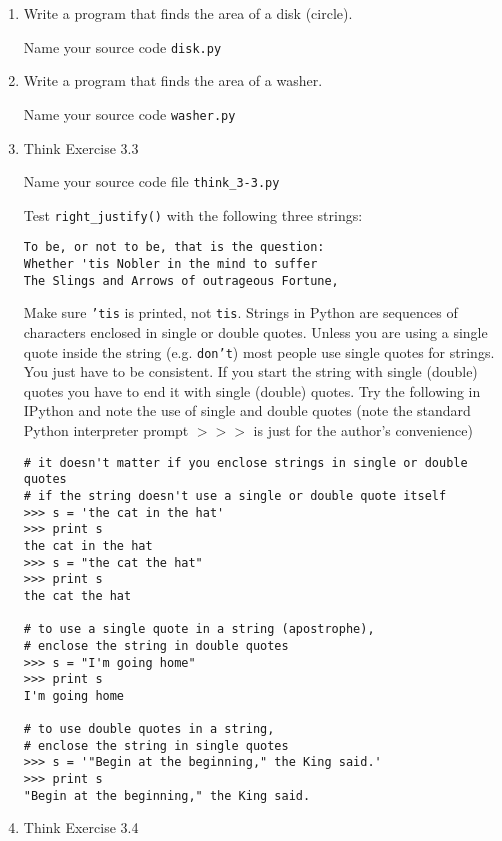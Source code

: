 \documentclass[12pt]{article}
\begin{document}
\begin{enumerate}

\item Write a program that finds the area of a disk (circle).

  Name your source code \texttt{disk.py}

\item Write a program that finds the area of a washer.

  Name your source code \texttt{washer.py}

\item{Think Exercise 3.3}

Name your source code file \texttt{think\_3-3.py}

Test \texttt{right\_justify()} with the following three strings:

\begin{verbatim}
To be, or not to be, that is the question:
Whether 'tis Nobler in the mind to suffer
The Slings and Arrows of outrageous Fortune,
\end{verbatim}

Make sure \texttt{'tis} is printed, not \texttt{tis}. Strings in Python are sequences of characters enclosed in single or double quotes. Unless you are using a single quote inside the string (e.g. \texttt{don't}) most people use single quotes for strings. You just have to be consistent. If you start the string with single (double) quotes you have to end it with single (double) quotes. Try the following in IPython and note the use of single and double quotes (note the standard Python interpreter prompt $>>>$ is just for the author's convenience)

\begin{verbatim}
# it doesn't matter if you enclose strings in single or double quotes
# if the string doesn't use a single or double quote itself
>>> s = 'the cat in the hat'
>>> print s
the cat in the hat
>>> s = "the cat the hat"
>>> print s
the cat the hat

# to use a single quote in a string (apostrophe), 
# enclose the string in double quotes
>>> s = "I'm going home"
>>> print s
I'm going home

# to use double quotes in a string, 
# enclose the string in single quotes
>>> s = '"Begin at the beginning," the King said.'
>>> print s
"Begin at the beginning," the King said.
\end{verbatim}


\item{Think Exercise 3.4}


\end{enumerate}
\end{document}
